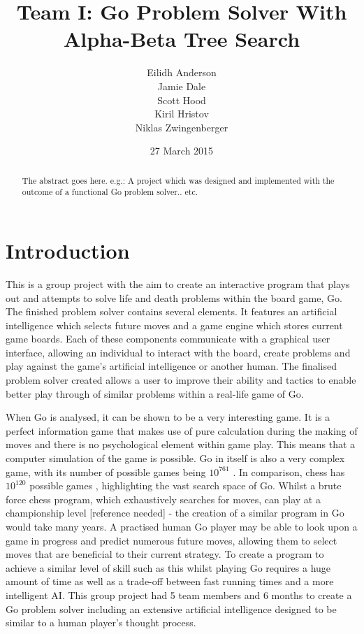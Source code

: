 \documentclass{l3proj}
\begin{document}
\title{Team I: Go Problem Solver With Alpha-Beta Tree Search}
\author{Eilidh Anderson \\
        Jamie Dale \\
        Scott Hood \\
        Kiril Hristov \\
        Niklas Zwingenberger}
\date{27 March 2015}
\maketitle
\begin{abstract}

The abstract goes here.
e.g.: A project which was designed and implemented with the outcome of a functional Go problem solver.. etc.

\end{abstract}
\educationalconsent

\tableofcontents

\chapter{Introduction}
\label{intro}

This is a group project with the aim to create an interactive program that plays out and attempts to solve life and death problems within the board game, Go. The finished problem solver contains several elements. It features an artificial intelligence which selects future moves and a game engine which stores current game boards. Each of these components communicate with a graphical user interface, allowing an individual to interact with the board, create problems and play against the game's artificial intelligence or another human. The finalised problem solver created allows a user to improve their ability and tactics to enable better play through of similar problems within a real-life game of Go.

When Go is analysed, it can be shown to be a very interesting game. It is a perfect information game that makes use of pure calculation during the making of moves and there is no psychological element within game play. This means that a computer simulation of the game is possible. Go in itself is also a very complex game, with its number of possible games being $10^{761}$ \cite{Tromp_2006}. In comparison, chess has $10^{120}$ possible games \cite{Shannon_1988}, highlighting the vast search space of Go. Whilst a brute force chess program, which exhaustively searches for moves, can play at a championship level [reference needed] - the creation of a similar program in Go would take many years. A practised human Go player may be able to look upon a game in progress and predict numerous future moves, allowing them to select moves that are beneficial to their current strategy. To create a program to achieve a similar level of skill such as this whilst playing Go requires a huge amount of time as well as a trade-off between fast running times and a more intelligent AI. This group project had 5 team members and 6 months to create a Go problem solver including an extensive artificial intelligence designed to be similar to a human player's thought process.
\end{document}
